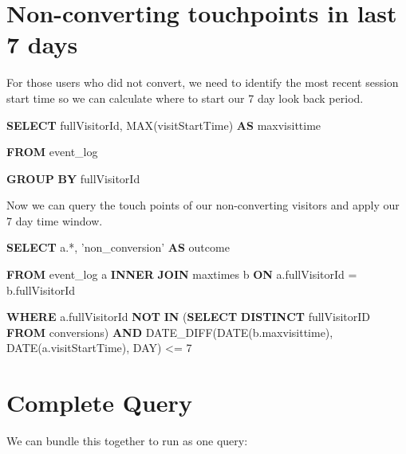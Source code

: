 \documentclass[]{book}
\newenvironment{Shaded}{\begin{snugshade}}{\end{snugshade}}
\newcommand{\KeywordTok}[1]{\textcolor[rgb]{0.13,0.29,0.53}{\textbf{#1}}}
\newcommand{\DataTypeTok}[1]{\textcolor[rgb]{0.13,0.29,0.53}{#1}}
\newcommand{\DecValTok}[1]{\textcolor[rgb]{0.00,0.00,0.81}{#1}}
\newcommand{\StringTok}[1]{\textcolor[rgb]{0.31,0.60,0.02}{#1}}
\newcommand{\FunctionTok}[1]{\textcolor[rgb]{0.00,0.00,0.00}{#1}}
\newcommand{\NormalTok}[1]{#1}
\begin{document}
\section{Non-converting touchpoints in last 7
days}\label{non-converting-touchpoints-in-last-7-days}

For those users who did not convert, we need to identify the most recent
session start time so we can calculate where to start our 7 day look
back period.

\begin{Shaded}
\begin{Highlighting}[]

\KeywordTok{SELECT}\NormalTok{ fullVisitorId, }
  \FunctionTok{MAX}\NormalTok{(visitStartTime) }\KeywordTok{AS}\NormalTok{ maxvisittime}
  
  \KeywordTok{FROM}\NormalTok{ event_log}
  
  \KeywordTok{GROUP} \KeywordTok{BY}\NormalTok{ fullVisitorId}
\end{Highlighting}
\end{Shaded}

Now we can query the touch points of our non-converting visitors and
apply our 7 day time window.

\begin{Shaded}
\begin{Highlighting}[]
\KeywordTok{SELECT}\NormalTok{ a.*,}
         \StringTok{'non_conversion'} \KeywordTok{AS}\NormalTok{ outcome}

  \KeywordTok{FROM}\NormalTok{ event_log a}
    \KeywordTok{INNER} \KeywordTok{JOIN}\NormalTok{ maxtimes b }\KeywordTok{ON}\NormalTok{ a.fullVisitorId = b.fullVisitorId }

  \KeywordTok{WHERE}\NormalTok{ a.fullVisitorId }\KeywordTok{NOT} \KeywordTok{IN}\NormalTok{ (}\KeywordTok{SELECT} \KeywordTok{DISTINCT}\NormalTok{ fullVisitorID }\KeywordTok{FROM}\NormalTok{ conversions)}
   \KeywordTok{AND}\NormalTok{  DATE_DIFF(}\DataTypeTok{DATE}\NormalTok{(b.maxvisittime), }\DataTypeTok{DATE}\NormalTok{(a.visitStartTime), }\DataTypeTok{DAY}\NormalTok{) <= }\DecValTok{7}
\end{Highlighting}
\end{Shaded}

\section{Complete Query}\label{complete-query}

We can bundle this together to run as one query:
\end{document}
